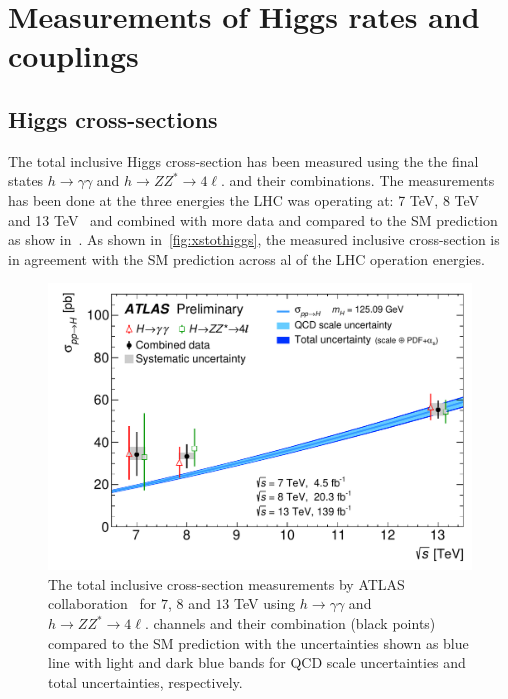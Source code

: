\section{Measurements of Higgs rates and couplings \label{sec:Higgscoupl} }
\subsection{Higgs cross-sections}
\par The total inclusive Higgs cross-section has been measured using the the final states $ h \to \gamma \gamma$ and $ h\to Z Z^* \to 4 \ell$. and their combinations.  The measurements has been done at the three energies the LHC was operating at: 7 TeV, 8 TeV ~\cite{CMS:2015zpx} and 13 TeV~\cite{TheATLAScollaboration:2015uuh,CMS:2018gwt,CMS:2021ugl} and combined with more data and compared to the SM prediction as show in~\cite{ATLAS:2019mju}. As shown in~\autoref{fig:xstothiggs}, the measured inclusive cross-section is in agreement with the SM prediction across al of the LHC operation energies.
\begin{figure}[htb!]
	\begin{center}
		\includegraphics[height=0.35\textheight]{figures/Higgs_results/fig_01}
		\caption{The total inclusive cross-section measurements by ATLAS collaboration~\cite{ATLAS:2019mju} for $7$, $8$ and $13$ TeV using  $ h \to \gamma \gamma$ and $ h\to Z Z^* \to 4 \ell$. channels and their combination (black points) compared to the SM prediction with the  uncertainties shown as blue line with light and dark blue bands for QCD scale uncertainties and total uncertainties, respectively. }	
		\label{fig:xstothiggs}
	\end{center}
\end{figure}
